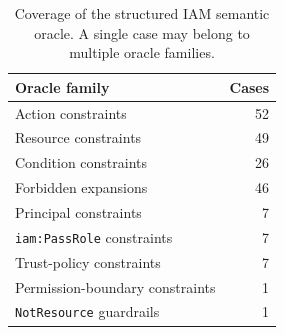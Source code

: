 \begin{table}[t]
\centering
\small
\caption{Coverage of the structured IAM semantic oracle. A single case may belong to multiple oracle families.}
\label{tab:structured-oracle-coverage}
\begin{tabular}{lr}
\toprule
Oracle family & Cases \\
\midrule
Action constraints & 52 \\
Resource constraints & 49 \\
Condition constraints & 26 \\
Forbidden expansions & 46 \\
Principal constraints & 7 \\
\texttt{iam:PassRole} constraints & 7 \\
Trust-policy constraints & 7 \\
Permission-boundary constraints & 1 \\
\texttt{NotResource} guardrails & 1 \\
\bottomrule
\end{tabular}
\end{table}
